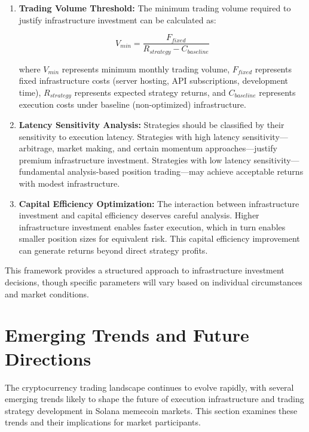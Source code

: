\documentclass[12pt,a4paper]{article}
\begin{document}
\begin{enumerate}
\item \textbf{Trading Volume Threshold:} The minimum trading volume required to justify infrastructure investment can be calculated as:

\begin{equation}
V_{min} = \frac{F_{fixed}}{R_{strategy} - C_{baseline}}
\end{equation}

where $V_{min}$ represents minimum monthly trading volume, $F_{fixed}$ represents fixed infrastructure costs (server hosting, API subscriptions, development time), $R_{strategy}$ represents expected strategy returns, and $C_{baseline}$ represents execution costs under baseline (non-optimized) infrastructure.

\item \textbf{Latency Sensitivity Analysis:} Strategies should be classified by their sensitivity to execution latency. Strategies with high latency sensitivity—arbitrage, market making, and certain momentum approaches—justify premium infrastructure investment. Strategies with low latency sensitivity—fundamental analysis-based position trading—may achieve acceptable returns with modest infrastructure.

\item \textbf{Capital Efficiency Optimization:} The interaction between infrastructure investment and capital efficiency deserves careful analysis. Higher infrastructure investment enables faster execution, which in turn enables smaller position sizes for equivalent risk. This capital efficiency improvement can generate returns beyond direct strategy profits.
\end{enumerate}

This framework provides a structured approach to infrastructure investment decisions, though specific parameters will vary based on individual circumstances and market conditions.

\section{Emerging Trends and Future Directions}

The cryptocurrency trading landscape continues to evolve rapidly, with several emerging trends likely to shape the future of execution infrastructure and trading strategy development in Solana memecoin markets. This section examines these trends and their implications for market participants.
\end{document}
